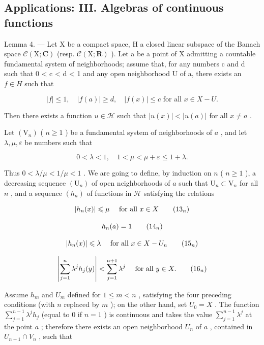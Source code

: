 \subsection{Applications: III. Algebras of continuous functions}

Lemma 4. --- Let X be a compact space, H a closed linear subspace of the Banach space \(\mathcal{C}(\mathrm{X};\mathbf{C})\) (resp. \(\mathcal{C}(\mathrm{X};\mathbf{R})\) ). Let a be a point of X admitting a countable fundamental system of neighborhoods; assume that, for any numbers c and d such that 0 < c < d < 1 and any open neighborhood U of a, there exists an \(f \in H\) such that

\[
| f | \leqslant 1, \quad | f (a) | \geqslant d, \quad | f (x) | \leqslant c \text {   for   all   } x \in X - U.\tag{12}
\]

Then there exists a function \(u \in \mathcal{H}\) such that \(|u(x)| < |u(a)|\) for all \(x \neq a\) .

Let \(\left(\mathrm{V}_{n}\right)\) ( \(n \geqslant 1\) ) be a fundamental system of neighborhoods of \(a\) , and let \(\lambda, \mu, \varepsilon\) be numbers such that

\[
0 <   \lambda <   1, \quad 1 <   \mu <   \mu + \varepsilon \leqslant 1 + \lambda .
\]

Thus \(0 < \lambda / \mu < 1 / \mu < 1\) . We are going to define, by induction on \(n\) ( \(n \geqslant 1\) ), a decreasing sequence \((\mathrm{U}_n)\) of open neighborhoods of \(a\) such that \(\mathrm{U}_n \subset \mathrm{V}_n\) for all \(n\) , and a sequence \((h_n)\) of functions in \(\mathcal{H}\) satisfying the relations

\[
\left| h _ {n} (x) \right| \leqslant \mu \quad \text { for   all } x \in X\tag{\ensuremath{13_n}}
\]

\[
h _ {n} (a) = 1\tag{\ensuremath{14_n}}
\]

\[
\left| h _ {n} (x) \right| \leqslant \lambda \quad \text { for   all } x \in X - U _ {n}\tag{\ensuremath{15_n}}
\]

\[
\left| \sum_ {j = 1} ^ {n} \lambda^ {j} h _ {j} (y) \right| <   \sum_ {j = 1} ^ {n + 1} \lambda^ {j} \quad \text { for   all } y \in X.\tag{\ensuremath{16_n}}
\]

Assume \(h_m\) and \(U_m\) defined for \(1 \leqslant m < n\) , satisfying the four preceding conditions (with \(n\) replaced by \(m\) ); on the other hand, set \(U_0 = X\) . The function \(\sum_{j=1}^{n-1} \lambda^j h_j\) (equal to 0 if \(n = 1\) ) is continuous and takes the value \(\sum_{j=1}^{n-1} \lambda^j\) at the point \(a\) ; therefore there exists an open neighborhood \(U_n\) of \(a\) , contained in \(U_{n-1} \cap V_n\) , such that

